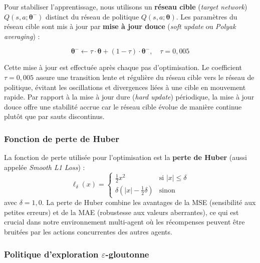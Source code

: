 \documentclass[conference]{IEEEtran}
\begin{document}
Pour stabiliser l'apprentissage, nous utilisons un \textbf{réseau cible} (\textit{target network}) $Q(s, a; \boldsymbol{\theta}^{-})$ distinct du réseau de politique $Q(s, a; \boldsymbol{\theta})$. Les paramètres du réseau cible sont mis à jour par \textbf{mise à jour douce} (\textit{soft update} ou \textit{Polyak averaging}) :

\begin{equation}
    \boldsymbol{\theta}^{-} \leftarrow \tau \cdot \boldsymbol{\theta} + (1 - \tau) \cdot \boldsymbol{\theta}^{-}, \quad \tau = 0{,}005
    \label{eq:soft_update}
\end{equation}

Cette mise à jour est effectuée après chaque pas d'optimisation. Le coefficient $\tau = 0{,}005$ assure une transition lente et régulière du réseau cible vers le réseau de politique, évitant les oscillations et divergences liées à une cible en mouvement rapide. Par rapport à la mise à jour dure (\textit{hard update}) périodique, la mise à jour douce offre une stabilité accrue car le réseau cible évolue de manière continue plutôt que par sauts discontinus.

\subsubsection{Fonction de perte de Huber}
\label{sec:huber_loss}

La fonction de perte utilisée pour l'optimisation est la \textbf{perte de Huber} (aussi appelée \textit{Smooth L1 Loss}) :
\begin{equation}
    \ell_{\delta}(x) = \begin{cases}
        \frac{1}{2}x^2 & \text{si } |x| \leq \delta \\
        \delta\left(|x| - \frac{1}{2}\delta\right) & \text{sinon}
    \end{cases}
    \label{eq:huber_loss}
\end{equation}
avec $\delta = 1{,}0$. La perte de Huber combine les avantages de la MSE (sensibilité aux petites erreurs) et de la MAE (robustesse aux valeurs aberrantes), ce qui est crucial dans notre environnement multi-agent où les récompenses peuvent être bruitées par les actions concurrentes des autres agents.

\subsubsection{Politique d'exploration $\varepsilon$-gloutonne}
\label{sec:epsilon_greedy}
\end{document}
